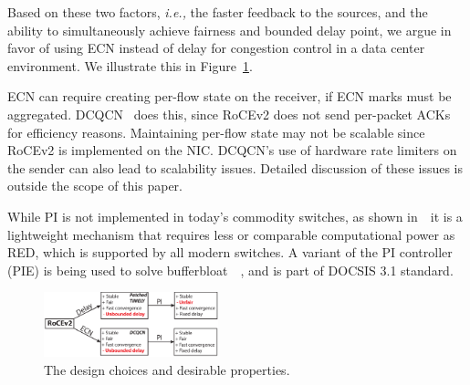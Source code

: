 Based on these two factors, {\em i.e.,} the faster feedback to the sources, and
the ability to simultaneously achieve fairness and bounded delay point, we argue
in favor of using ECN instead of delay for congestion control in a data center
environment. We illustrate this in Figure~\ref{fig:design_choice}.

ECN can require creating per-flow state on the receiver, if ECN marks must be
aggregated. DCQCN~\cite{dcqcn} does this, since RoCEv2 does not send per-packet
ACKs for efficiency reasons. Maintaining per-flow state may not be scalable since
RoCEv2 is implemented on the NIC.  DCQCN's use of hardware rate limiters on the
sender can also lead to scalability issues.  Detailed discussion of these issues
is outside the scope of this paper.

While PI is not implemented in today's commodity switches, as shown
in~\cite{hollot2001designing}~it is a lightweight mechanism that requires less
or comparable computational power as RED, which is supported by all modern
switches. A variant of the PI controller (PIE) is being used to solve
bufferbloat~\cite{conf/hpsr/PanNPPSBV13,bufferbloat-pi}~, and is part of DOCSIS 3.1
standard.

\begin{figure}[t]
 \center
\includegraphics[width=0.45\textwidth]{figures/design_choice.eps}
\vspace{-0.5em}
 \caption{The design choices and desirable properties.}
\vspace{-1.5em}
\label{fig:design_choice}
\end{figure}


